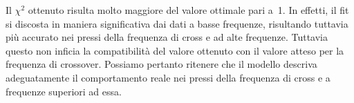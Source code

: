 \documentclass[../Relazione_circuiti]{subfiles}
\begin{document}
  Il $\chi^2$ ottenuto risulta molto maggiore del valore ottimale pari a~1.
  In effetti, il fit si discosta in maniera significativa dai dati a basse frequenze, risultando tuttavia più
  accurato nei pressi della frequenza di cross e ad alte frequenze.
Tuttavia questo non inficia la compatibilità del valore ottenuto con il valore atteso per la frequenza di crossover.
  Possiamo pertanto ritenere che il modello descriva adeguatamente il comportamento reale nei pressi della frequenza
  di cross e a frequenze superiori ad essa.
\end{document}
